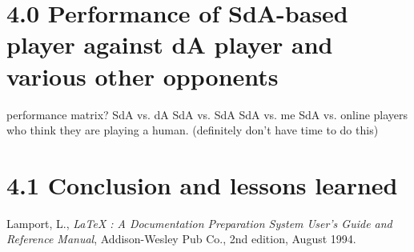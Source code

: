 \documentclass[11pt]{article}
\begin{document}
\section{4.0 Performance of SdA-based player against dA player and various other opponents}
\label{Performance of SdA-based player against dA player and various other opponents}

performance matrix?
SdA vs. dA
SdA vs. SdA
SdA vs. me
SdA vs. online players who think they are playing a human. (definitely don't have time to do this)

\section{4.1 Conclusion and lessons learned}
\label{Conclusion and lessons learned}




\begin{thebibliography}{99}
 Lamport, L., {\it LaTeX : A Documentation
 Preparation System User's Guide and Reference Manual}, Addison-Wesley 
 Pub Co., 2nd edition, August 1994.
\end{thebibliography}


\end{document}
